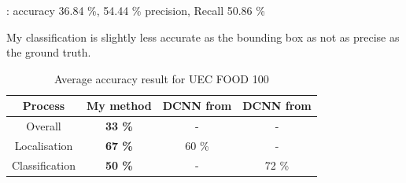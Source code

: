 \cite{Bolanos2016} : accuracy 36.84 \%, 54.44 \% precision, Recall 50.86 \%

My classification is slightly less accurate as the bounding box as not as precise as the ground truth.

\begin{table}
    \centering
    \renewcommand{\arraystretch}{1.2}
    \begin{tabulary}{\textwidth}{| C | C c c|} 
        \hline
        Process & My method & DCNN from \cite{Shimoda2015} & DCNN from  \cite{Kawano2014} \\
        \hline
        Overall & \textbf{33 \%} & - & - \\ 
        \hline
        Localisation &  \textbf{67 \%} & 60 \% & - \\
        \hline
        Classification &  \textbf{50 \%} & -  & 72 \% \\
        \hline
    \end{tabulary}
    \caption{Average accuracy result for UEC FOOD 100}
\end{table}

